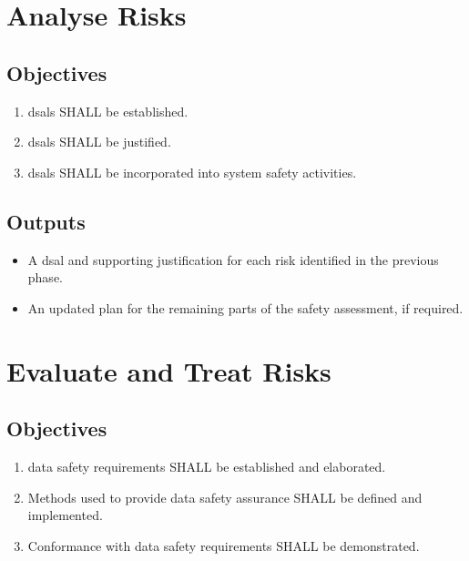 \section{Analyse Risks}
\subsection{Objectives}
\begin{enumerate}[label=\color{dsiwgAccentColour}{3-\arabic*}]
	\item \Glspl{dsal} SHALL be established.
	\item \Glspl{dsal} SHALL be justified.
	\item \Glspl{dsal} SHALL be incorporated into system safety activities.
\end{enumerate}

\subsection{Outputs}
\begin{itemize}
	\item A \gls{dsal} and supporting justification for each risk identified in the previous phase.
	\item An updated plan for the remaining parts of the \gls{safety assessment}, if required.
\end{itemize}

\section{Evaluate and Treat Risks}
\subsection{Objectives}
\begin{enumerate}[label=\color{dsiwgAccentColour}{4-\arabic*}]
	\item {}\Glspl{data safety requirement} SHALL be established and elaborated.
	\item Methods used to provide data safety assurance SHALL be defined and implemented.
	\item Conformance with \glspl{data safety requirement} SHALL be demonstrated.	
\end{enumerate}

